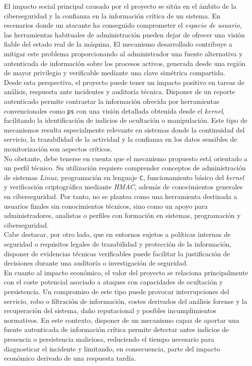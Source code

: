 El impacto social principal causado por el proyecto se sitúa en el ámbito de la ciberseguridad y la confianza en la información crítica de un sistema.
En escenarios donde un atacante ha conseguido comprometer el \textit{espacio de usuario}, las herramientas habituales de administración pueden dejar de ofrecer una visión fiable del estado real de la máquina.
El mecanismo desarrollado contribuye a mitigar este problema proporcionando al administrador una fuente alternativa y autenticada de información sobre los procesos activos, generada desde una región de mayor privilegio y verificable mediante una clave simétrica compartida.\\

Desde esta perspectiva, el proyecto puede tener un impacto positivo en tareas de análisis, respuesta ante incidentes y auditoría técnica.
Disponer de un reporte autenticado permite contrastar la información ofrecida por herramientas convencionales como \texttt{ps} con una visión detallada obtenida desde el \textit{kernel}, facilitando la identificación de indicios de ocultación o manipulación.
Este tipo de mecanismos resulta especialmente relevante en sistemas donde la continuidad del servicio, la trazabilidad de la actividad y la confianza en los datos sensibles de monitorización son aspectos críticos.\\

No obstante, debe tenerse en cuenta que el mecanismo propuesto está orientado a un perfil técnico.
Su utilización requiere comprender conceptos de administración de sistemas \textit{Linux}, programación en lenguaje \texttt{C}, funcionamiento básico del \textit{kernel} y verificación criptográfica mediante \textit{HMAC}, además de conocimientos generales en ciberseguridad.
Por tanto, no se plantea como una herramienta destinada a usuarios finales sin conocimientos técnicos, sino como un apoyo para administradores, analistas o perfiles con formación en sistemas, programación y ciberseguridad.\\

Cabe destacar, por otro lado, que en entornos sujetos a políticas internas de seguridad o requisitos legales de trazabilidad y protección de la información, disponer de evidencias técnicas verificables puede facilitar la justificación de decisiones durante una auditoría o investigación de seguridad.\\

En cuanto al impacto económico, el valor del proyecto se relaciona principalmente con el coste potencial asociado a ataques con capacidades de ocultación y persistencia.
Un compromiso de este tipo puede provocar interrupciones del servicio, robo o filtración de información, costes derivados del análisis forense y la recuperación del sistema, daño reputacional y posibles incumplimientos normativos.
En este contexto, disponer de un mecanismo capaz de aportar una fuente autenticada de información crítica permite detectar antes indicios de presencia o persistencia maliciosa, reduciendo el tiempo necesario para diagnosticar el incidente y limitando, en consecuencia, parte del impacto económico derivado de una respuesta tardía.\\

